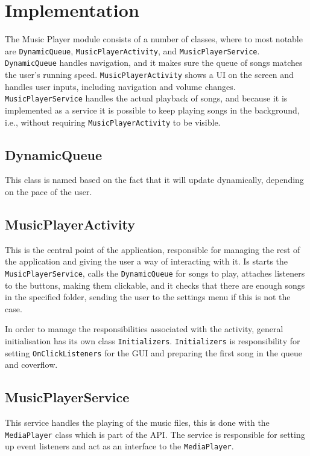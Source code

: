 \section{Implementation}
The Music Player module consists of a number of classes, where to most notable are \texttt{DynamicQueue}, \texttt{MusicPlayerActivity}, and \texttt{MusicPlayerService}. \texttt{DynamicQueue} handles navigation, and it makes sure the queue of songs matches the user's running speed. \texttt{MusicPlayerActivity} shows a UI on the screen and handles user inputs, including navigation and volume changes. \texttt{MusicPlayerService} handles the actual playback of songs, and because it is implemented as a service it is possible to keep playing songs in the background, i.e., without requiring \texttt{MusicPlayerActivity} to be visible.

\subsection{DynamicQueue}
\label{sec:dynamicQueue}
This class is named based on the fact that it will update dynamically, depending on the pace of the user.

\subsection{MusicPlayerActivity}
This is the central point of the application, responsible for managing the rest of the application and giving the user a way of interacting with it. Is starts the \texttt{MusicPlayerService}, calls the \texttt{DynamicQueue} for songs to play, attaches listeners to the buttons, making them clickable, and it checks that there are enough songs in the specified folder, sending the user to the settings menu if this is not the case.

In order to manage the responsibilities associated with the activity, general initialisation has its own class \texttt{Initializers}. \texttt{Initializers} is responsibility for setting \texttt{OnClickListeners} for the GUI and preparing the first song in the queue and coverflow. 

\subsection{MusicPlayerService} 
This service handles the playing of the music files, this is done with the \texttt{MediaPlayer} class which is part of the \citet{android:MediaPlayer} API. The service is responsible for setting up event listeners and act as an interface to the \texttt{MediaPlayer}.  

